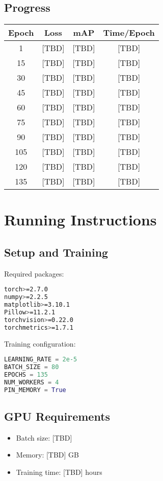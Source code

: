 \documentclass[conference]{IEEEtran}
\begin{document}
\subsection{Progress}
\begin{center}
\begin{tabular}{cccc}
\toprule
Epoch & Loss & mAP & Time/Epoch \\
\midrule
1 & [TBD] & [TBD] & [TBD] \\
15 & [TBD] & [TBD] & [TBD] \\
30 & [TBD] & [TBD] & [TBD] \\
45 & [TBD] & [TBD] & [TBD] \\
60 & [TBD] & [TBD] & [TBD] \\
75 & [TBD] & [TBD] & [TBD] \\
90 & [TBD] & [TBD] & [TBD] \\
105 & [TBD] & [TBD] & [TBD] \\
120 & [TBD] & [TBD] & [TBD] \\
135 & [TBD] & [TBD] & [TBD] \\
\bottomrule
\end{tabular}
\end{center}

\section{Running Instructions}

\subsection{Setup and Training}

\begin{center}
Required packages:
\begin{lstlisting}[language=bash]
torch>=2.7.0
numpy>=2.2.5
matplotlib>=3.10.1
Pillow>=11.2.1
torchvision>=0.22.0
torchmetrics>=1.7.1
\end{lstlisting}

Training configuration:
\begin{lstlisting}[language=python]
LEARNING_RATE = 2e-5
BATCH_SIZE = 80
EPOCHS = 135
NUM_WORKERS = 4
PIN_MEMORY = True
\end{lstlisting}
\end{center}

\subsection{GPU Requirements}
\begin{itemize}
    \item Batch size: [TBD]
    \item Memory: [TBD] GB
    \item Training time: [TBD] hours
\end{itemize}
\end{document}
